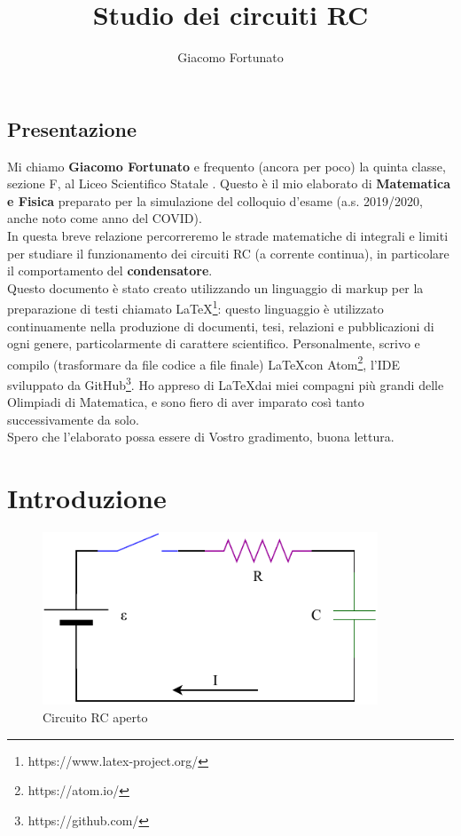 \documentclass[a3paper, twoside, openany]{book}
\title{Studio dei circuiti RC}
\author{Giacomo Fortunato}
\begin{document}
\maketitle
\section{Presentazione}
Mi chiamo \textbf{Giacomo Fortunato} e frequento (ancora per poco) la quinta classe, sezione F, al Liceo Scientifico Statale . Questo è il mio elaborato di \textbf{Matematica e Fisica} preparato per la simulazione del colloquio d'esame (a.s. 2019/2020, anche noto come anno del COVID). \\ In questa breve relazione percorreremo le strade matematiche di integrali e limiti per studiare il funzionamento dei circuiti RC (a corrente continua), in particolare il comportamento del \textbf{condensatore}. \\ Questo documento è stato creato utilizzando un linguaggio di markup per la preparazione di testi chiamato \LaTeX\footnote{https://www.latex-project.org/}: questo linguaggio è utilizzato continuamente nella produzione di documenti, tesi, relazioni e pubblicazioni di ogni genere, particolarmente di carattere scientifico. Personalmente, scrivo e compilo (trasformare da file codice a file finale) \LaTeX con Atom\footnote{https://atom.io/}, l'IDE sviluppato da GitHub\footnote{https://github.com/}. Ho appreso di \LaTeX dai miei compagni più grandi delle Olimpiadi di Matematica, e sono fiero di aver imparato così tanto successivamente da solo. \\ Spero che l'elaborato possa essere di Vostro gradimento, buona lettura.
\chapter{Introduzione}
\begin{figure}[htp]
    \centering
    \includegraphics[width=10cm]{Circuito RC-Aperto}
    \caption{Circuito RC aperto}
    \label{fig:RC-aperto}
\end{figure}
\end{document}
